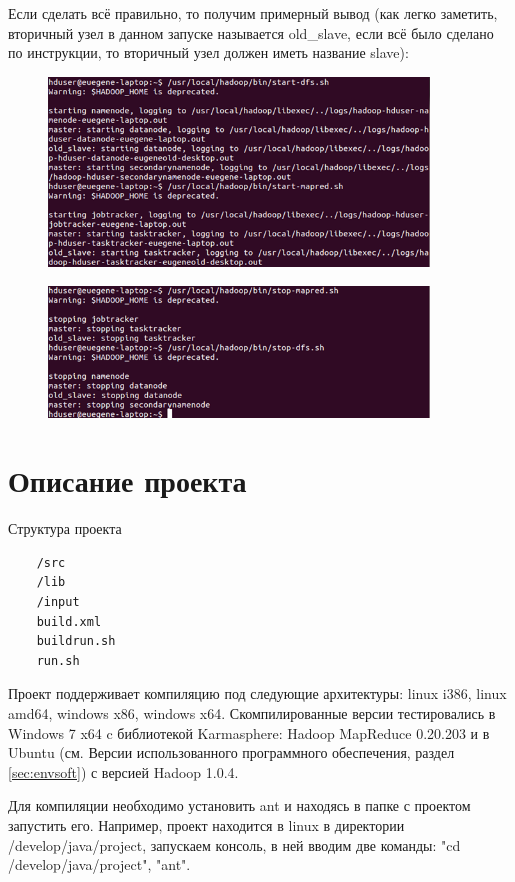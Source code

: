 \documentclass[12pt,a4paper]{extarticle} %
\begin{document}
\newpage
\noindent Если сделать всё правильно, то получим примерный вывод (как легко заметить, вторичный узел в данном запуске называется old\_slave, если всё было сделано по инструкции, то вторичный узел должен иметь название slave):
\begin{figure}[h]
 \centering
    \includegraphics[width=0.9\textwidth]{images/4.png}
\end{figure}
\begin{figure}[h]
 \centering
    \includegraphics[width=0.9\textwidth]{images/5.png}
\end{figure}

\clearpage\newpage
\section{Описание проекта}
Структура проекта
\begin{lstlisting}    
    /src
    /lib
    /input
    build.xml
    buildrun.sh
    run.sh
\end{lstlisting}

    Проект поддерживает компиляцию под следующие архитектуры: linux i386, linux amd64, windows x86, windows x64. Скомпилированные версии тестировались в Windows 7 x64 c библиотекой Karmasphere: Hadoop MapReduce 0.20.203 и в Ubuntu (см. Версии использованного программного обеспечения, раздел \ref{sec:envsoft}) с версией Hadoop 1.0.4.

    Для компиляции необходимо установить ant и находясь в папке с проектом запустить его. Например, проект находится в linux в директории /develop/java/project, запускаем консоль, в ней вводим две команды: "cd  /develop/java/project", "ant".
\end{document}
